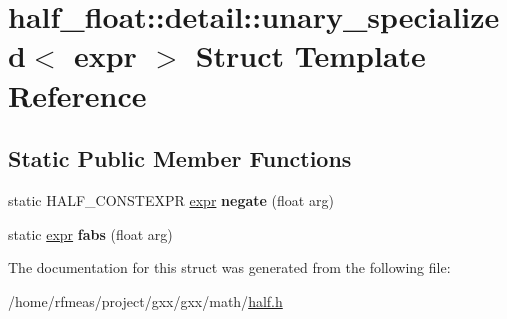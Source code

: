 \hypertarget{structhalf__float_1_1detail_1_1unary__specialized_3_01expr_01_4}{}\section{half\+\_\+float\+:\+:detail\+:\+:unary\+\_\+specialized$<$ expr $>$ Struct Template Reference}
\label{structhalf__float_1_1detail_1_1unary__specialized_3_01expr_01_4}
\subsection*{Static Public Member Functions}
\begin{DoxyCompactItemize}
\item 
static H\+A\+L\+F\+\_\+\+C\+O\+N\+S\+T\+E\+X\+PR \hyperlink{structhalf__float_1_1detail_1_1expr}{expr} {\bfseries negate} (float arg)\hypertarget{structhalf__float_1_1detail_1_1unary__specialized_3_01expr_01_4_a52fafe72dd5633b391289700c7d41851}{}\label{structhalf__float_1_1detail_1_1unary__specialized_3_01expr_01_4_a52fafe72dd5633b391289700c7d41851}

\item 
static \hyperlink{structhalf__float_1_1detail_1_1expr}{expr} {\bfseries fabs} (float arg)\hypertarget{structhalf__float_1_1detail_1_1unary__specialized_3_01expr_01_4_a8e93062c896cf81bcc9e6d079d55df63}{}\label{structhalf__float_1_1detail_1_1unary__specialized_3_01expr_01_4_a8e93062c896cf81bcc9e6d079d55df63}

\end{DoxyCompactItemize}


The documentation for this struct was generated from the following file\+:\begin{DoxyCompactItemize}
\item 
/home/rfmeas/project/gxx/gxx/math/\hyperlink{half_8h}{half.\+h}\end{DoxyCompactItemize}
